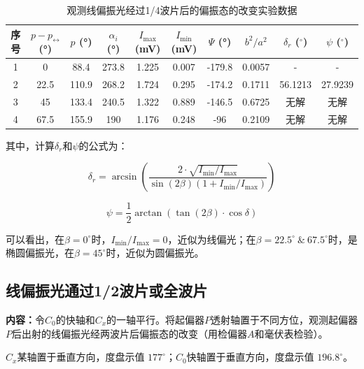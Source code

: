 \documentclass[UTF8]{ctexart}
\begin{document}
\begin{table}[h]
    \centering
    \begin{tabular}{|c|c|c|c|c|c|c|c|c|c|}
        \hline
        序号 & $p-p_{\leftrightarrow}$ (°) & $p$ (°) & $\alpha_i$ (°) & $I_{\text{max}}$ (mV) & $I_{\text{min}}$ (mV) & $\Psi$ (°) & $b^2/a^2$ & $\delta_r$ ($^{\circ}$) & $\psi$ ($^{\circ}$) \\ \hline
        1 & 0 & 88.4 & 273.8 & 1.225 & 0.007 & -179.8 & 0.0057 & - & - \\ \hline
        2 & 22.5 & 110.9 & 268.2 & 1.724 & 0.295 & -174.2 & 0.1711 & 56.1213 & 27.9239 \\ \hline
        3 & 45 & 133.4 & 240.5 & 1.322 & 0.889 & -146.5 & 0.6725 & 无解 & 无解 \\ \hline
        4 & 67.5 & 155.9 & 190 & 1.176 & 0.248 & -96 & 0.2109 & 无解 & 无解 \\ \hline
    \end{tabular}
    \caption{观测线偏振光经过1/4波片后的偏振态的改变实验数据}
    \label{tab:1.7.1}
\end{table}

其中，计算$\delta_r$和$\psi$的公式为：

\begin{equation}
    \delta_r = \arcsin\left(\frac{2\cdot \sqrt{I_{\text{min}}/I_{\text{max}}}}{\sin(2\beta)(1+I_{\text{min}}/I_{\text{max}})}\right)
\end{equation}

\begin{equation}
    \psi = \frac{1}{2}\arctan(\tan(2\beta)\cdot\cos\delta)
\end{equation}

可以看出，在$\beta=0^{\circ}$时，$I_{\text{min}}/I_{\text{max}}=0$，近似为线偏光；在$\beta=22.5^{\circ}\ \&\ 67.5^{\circ}$时，是椭圆偏振光，在$\beta=45^{\circ}$时，近似为圆偏振光。

\subsection{线偏振光通过1/2波片或全波片}

\textbf{内容：}令$C_0$的快轴和$C_x$的一轴平行。将起偏器$P$透射轴置于不同方位，观测起偏器$P$后出射的线偏振光经两波片后偏振态的改变（用检偏器$A$和毫伏表检验）。

$C_x$某轴置于垂直方向，度盘示值 $177^{\circ}$；$C_0$快轴置于垂直方向，度盘示值 $196.8^{\circ}$。
\end{document}
